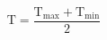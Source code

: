 \documentclass[12pt]{article}
\begin{document}
\begin{displaymath}
\mathrm{T}=\frac{\mathrm{T}_{\mathrm{max}}+\mathrm{T}_{\mathrm{min}}}{2}
\end{displaymath}
\end{document}
